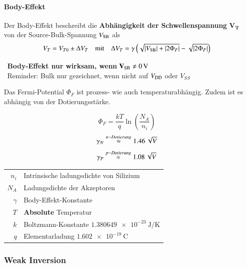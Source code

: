 \paragraph{Body-Effekt}
Der Body-Effekt beschreibt die \textbf{Abhängigkeit der Schwellenspannung} $\bm{V_T}$ von der Source-Bulk-Spannung $V_{\rm SB}$ als
\[ 
    V_T = V_{T0} \pm \Delta V_T 
    \quad \text{mit} \quad 
    \Delta V_T = \gamma\left(\sqrt{\left|V_{\rm SB}\right| + \left|2\Phi_F\right|}-\sqrt{\left|2\Phi_F\right|}\right)
\]

\rightarrow\ \textbf{Body-Effekt nur wirksam, wenn} $\mathbf{V_{\rm SB} \neq \qty{0}{\volt}}$ \\
\rightarrow\ Reminder: Bulk nur gezeichnet, wenn nicht auf $V_{\rm DD}$ oder $V_{SS}$

\medskip

Das Fermi-Potential $\Phi_F$ ist prozess- wie auch temperaturabhängig. Zudem ist es abhängig von der Dotierungsstärke.

\begin{minipage}[c]{0.3\columnwidth}
    \[ \Phi_F = \frac{kT}{q} \ln \left( \frac{N_A}{n_i} \right) \]
    \[ \gamma_N \overset{n-Dotierung}{\approx} \qty{1.46}{\sqrt{\volt}} \]
    \[ \gamma_P \overset{p-Dotierung}{\approx} \qty{1.08}{\sqrt{\volt}} \]
\end{minipage}
\hfill
\begin{minipage}[c]{0.68\columnwidth}
    \begin{tabular}{rl}
        $n_i$       & Intrinsische ladungsdichte von Silizium   \\
        $N_A$       & Ladungsdichte der Akzeptoren              \\
        $\gamma$    & Body-Effekt-Konstante                     \\
        $T$         & \textbf{Absolute} Temperatur              \\
        $k$         & Boltzmann-Konstante $\qty{1.380649 e-23}{\joule\per\kelvin}$  \\
        $q$         & Elementarladung $\qty{1.602 e-19}{\coulomb}$
    \end{tabular}
\end{minipage}


\subsubsection{Weak Inversion}

\vspace{-0.3cm}

